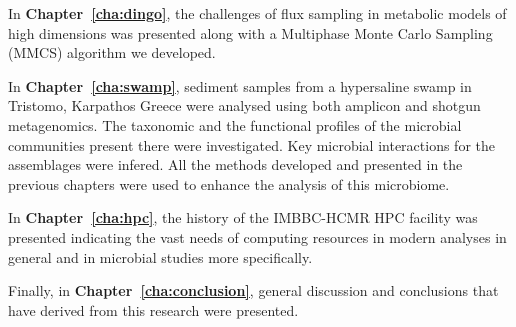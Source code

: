    In \textbf{Chapter~\ref{cha:dingo}}, the challenges of flux sampling in metabolic models of high dimensions was presented along with a Multiphase Monte Carlo Sampling (MMCS) algorithm we developed. 

   In \textbf{Chapter~\ref{cha:swamp}}, sediment samples from a hypersaline swamp in Tristomo, Karpathos Greece were analysed using both amplicon and shotgun metagenomics. 
   The taxonomic and the functional profiles of the microbial communities present there were investigated. 
   Key microbial interactions for the assemblages were infered. 
   All the methods developed and presented in the previous chapters were used to enhance the analysis of this microbiome.

   In \textbf{Chapter~\ref{cha:hpc}}, the history of the IMBBC-HCMR HPC facility was presented indicating the vast needs of computing resources in modern analyses in general and in microbial studies more specifically. 


   Finally, in \textbf{Chapter~\ref{cha:conclusion}}, general discussion and conclusions that have derived from this research were presented. 






